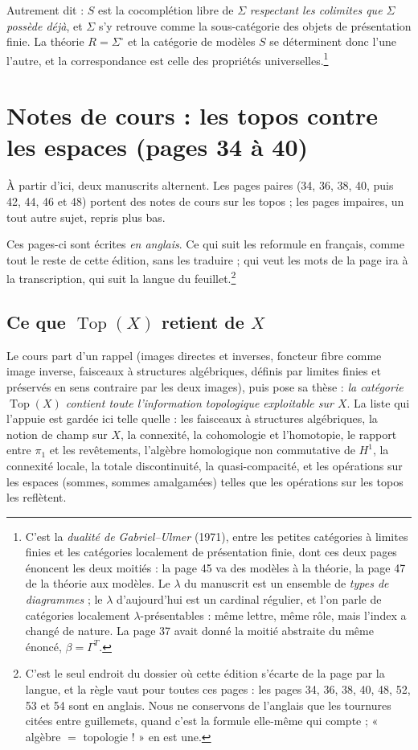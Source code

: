 \documentclass[11pt,a4paper]{article}
\begin{document}
Autrement dit : $S$ est la cocomplétion libre de $\Sigma$ \emph{respectant les
colimites que $\Sigma$ possède déjà}, et $\Sigma$ s'y retrouve comme la
sous-catégorie des objets de présentation finie. La théorie $R = \Sigma^{\circ}$
et la catégorie de modèles $S$ se déterminent donc l'une l'autre, et la
correspondance est celle des propriétés universelles.\footnote{C'est la
\emph{dualité de Gabriel--Ulmer} (1971), entre les petites catégories à limites
finies et les catégories localement de présentation finie, dont ces deux pages
énoncent les deux moitiés : la page 45 va des modèles à la théorie, la page 47
de la théorie aux modèles. Le $\lambda$ du manuscrit est un ensemble de
\emph{types de diagrammes} ; le $\lambda$ d'aujourd'hui est un cardinal
régulier, et l'on parle de catégories localement $\lambda$-présentables : même
lettre, même rôle, mais l'index a changé de nature. La page 37 avait
donné la moitié abstraite du même énoncé, $\beta = \Gamma^{T}$.}


\section*{Notes de cours : les topos contre les espaces (pages 34 à 40)}

À partir d'ici, deux manuscrits alternent. Les pages paires (34, 36, 38, 40,
puis 42, 44, 46 et 48) portent des notes de cours sur les
topos ; les pages impaires, un tout autre sujet, repris plus bas.

Ces pages-ci sont écrites \emph{en anglais}. Ce qui suit les reformule en
français, comme tout le reste de cette édition, sans les traduire ; qui veut les mots de la page ira à la transcription, qui suit la
langue du feuillet.\footnote{C'est le seul endroit du dossier où cette édition
s'écarte de la page par la langue, et la règle vaut pour toutes ces pages : les pages 34, 36, 38, 40, 48, 52, 53 et 54 sont en anglais. Nous ne conservons de l'anglais que les tournures
citées entre guillemets, quand c'est la formule elle-même qui compte ; « algèbre
$=$ topologie ! » en est une.}

\subsection*{Ce que $\operatorname{Top}(X)$ retient de $X$}

Le cours part d'un rappel (images directes et inverses, foncteur fibre comme
image inverse, faisceaux à structures algébriques, définis par limites finies
et préservés en sens contraire par les deux images), puis pose sa thèse :
\emph{la catégorie $\operatorname{Top}(X)$ contient toute l'information
topologique exploitable sur $X$}. La liste qui l'appuie est gardée ici
telle quelle : les faisceaux à structures algébriques, la notion de champ sur
$X$, la connexité, la cohomologie et l'homotopie, le rapport entre $\pi_{1}$ et
les revêtements, l'algèbre homologique non commutative de $H^{1}$, la
connexité locale, la totale discontinuité, la quasi-compacité, et les
opérations sur les espaces (sommes, sommes amalgamées) telles que les
opérations sur les topos les reflètent.
\end{document}
